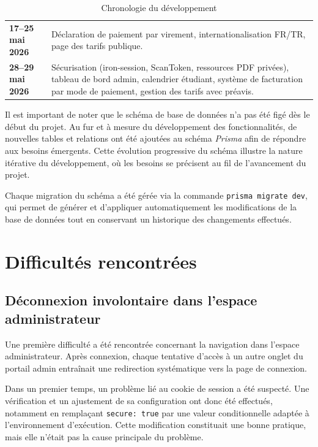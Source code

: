 \documentclass{article}
\begin{document}
\begin{table}[H]
\begin{tabular}{>{\bfseries}p{3.5cm} p{10cm}}
17--25 mai 2026 & 
Déclaration de paiement par virement, internationalisation 
FR/TR, page des tarifs publique. \\

28--29 mai 2026 & 
Sécurisation (iron-session, ScanToken, ressources PDF privées), 
tableau de bord admin, calendrier étudiant, système de 
facturation par mode de paiement, gestion des tarifs 
avec préavis. \\
\bottomrule
\end{tabular}
\caption{Chronologie du développement}
\label{tab:timeline}
\end{table}

Il est important de noter que le schéma de base de données n'a pas
été figé dès le début du projet. Au fur et à mesure du développement
des fonctionnalités, de nouvelles tables et relations ont été ajoutées
au schéma \textit{Prisma} afin de répondre aux besoins émergents.
Cette évolution progressive du schéma illustre la nature itérative
du développement, où les besoins se précisent au fil de l'avancement
du projet.

Chaque migration du schéma a été gérée via la commande
\texttt{prisma migrate dev}, qui permet de générer et d'appliquer
automatiquement les modifications de la base de données tout en
conservant un historique des changements effectués.

\section{Difficultés rencontrées}

\subsection{Déconnexion involontaire dans l'espace administrateur}

Une première difficulté a été rencontrée concernant la navigation dans 
l'espace administrateur. Après connexion, chaque tentative d'accès à un 
autre onglet du portail admin entraînait une redirection systématique vers 
la page de connexion.

Dans un premier temps, un problème lié au cookie de session a été suspecté. 
Une vérification et un ajustement de sa configuration ont donc été effectués, 
notamment en remplaçant \texttt{secure: true} par une valeur conditionnelle 
adaptée à l'environnement d'exécution. Cette modification constituait une 
bonne pratique, mais elle n'était pas la cause principale du problème.
\end{document}
